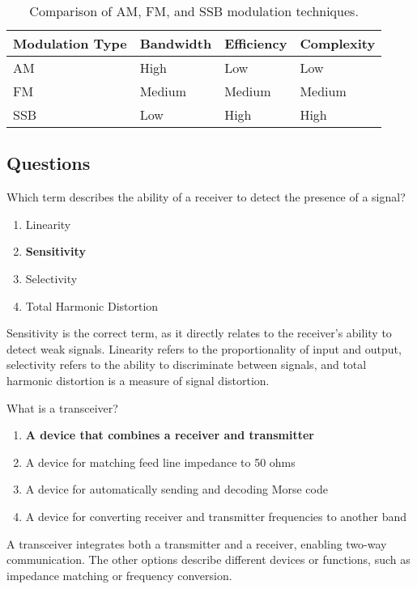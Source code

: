 \begin{table}[h!]
    \centering
    \begin{tabular}{|l|l|l|l|}
        \hline
        \textbf{Modulation Type} & \textbf{Bandwidth} & \textbf{Efficiency} & \textbf{Complexity} \\
        \hline
        AM & High & Low & Low \\
        FM & Medium & Medium & Medium \\
        SSB & Low & High & High \\
        \hline
    \end{tabular}
    \caption{Comparison of AM, FM, and SSB modulation techniques.}
    \label{tab:modulation_comparison}
\end{table}

\subsection*{Questions}
\begin{tcolorbox}[colback=gray!10!white,colframe=black!75!black,title={T7A01}]
    Which term describes the ability of a receiver to detect the presence of a signal?
    \begin{enumerate}[label=\Alph*,noitemsep]
        \item Linearity
        \item \textbf{Sensitivity}
        \item Selectivity
        \item Total Harmonic Distortion
    \end{enumerate}
\end{tcolorbox}
Sensitivity is the correct term, as it directly relates to the receiver's ability to detect weak signals. Linearity refers to the proportionality of input and output, selectivity refers to the ability to discriminate between signals, and total harmonic distortion is a measure of signal distortion.


\begin{tcolorbox}[colback=gray!10!white,colframe=black!75!black,title={T7A02}]
    What is a transceiver?
    \begin{enumerate}[label=\Alph*,noitemsep]
        \item \textbf{A device that combines a receiver and transmitter}
        \item A device for matching feed line impedance to 50 ohms
        \item A device for automatically sending and decoding Morse code
        \item A device for converting receiver and transmitter frequencies to another band
    \end{enumerate}
\end{tcolorbox}
A transceiver integrates both a transmitter and a receiver, enabling two-way communication. The other options describe different devices or functions, such as impedance matching or frequency conversion.

